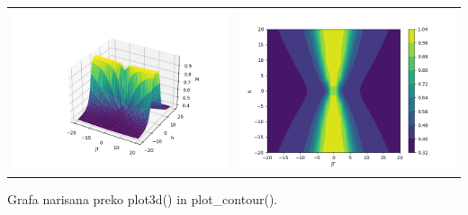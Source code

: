 \documentclass{article}
\begin{document}
\begin{tabular}{c c}
     \includegraphics[width = .5 \linewidth]{2TFIM1.png}
     &  
     \includegraphics[width = .5 \linewidth]{2TFIM2.png}\\
\end{tabular}
Grafa narisana preko plot3d() in plot\_contour().
\end{document}
